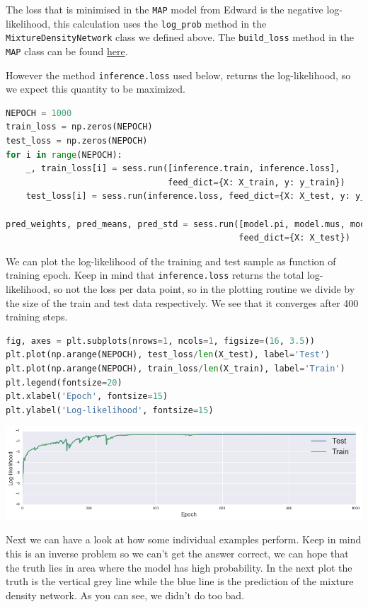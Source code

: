 The loss that is minimised in the \texttt{MAP} model from Edward is the negative log-likelihood, this calculation uses the  \texttt{log_prob} method in the \texttt{MixtureDensityNetwork} class we defined above.
The \texttt{build_loss} method in the \texttt{MAP} class can be found \href{https://github.com/blei-lab/edward/blob/master/edward/inferences.py#L396}{here}.

However the method \texttt{inference.loss} used below, returns the log-likelihood, so we expect this quantity to be maximized.

\begin{lstlisting}[language=Python]
NEPOCH = 1000
train_loss = np.zeros(NEPOCH)
test_loss = np.zeros(NEPOCH)
for i in range(NEPOCH):
    _, train_loss[i] = sess.run([inference.train, inference.loss],
                                feed_dict={X: X_train, y: y_train})
    test_loss[i] = sess.run(inference.loss, feed_dict={X: X_test, y: y_test})

pred_weights, pred_means, pred_std = sess.run([model.pi, model.mus, model.sigmas],
                                              feed_dict={X: X_test})
\end{lstlisting}

We can plot the log-likelihood of the training and test sample as function of training epoch.
Keep in mind that \texttt{inference.loss} returns the total log-likelihood, so not the loss per data point, so in the plotting routine we divide by the size of the train and test data respectively.
We see that it converges after 400 training steps.

\begin{lstlisting}[language=Python]
fig, axes = plt.subplots(nrows=1, ncols=1, figsize=(16, 3.5))
plt.plot(np.arange(NEPOCH), test_loss/len(X_test), label='Test')
plt.plot(np.arange(NEPOCH), train_loss/len(X_train), label='Train')
plt.legend(fontsize=20)
plt.xlabel('Epoch', fontsize=15)
plt.ylabel('Log-likelihood', fontsize=15)
\end{lstlisting}

\includegraphics[width=700px]{images/mdn-fig1.png}

Next we can have a look at how some individual examples perform. Keep in mind this is an inverse problem
so we can't get the answer correct, we can hope that the truth lies in area where the model has high probability.
In the next plot the truth is the vertical grey line while the blue line is the prediction of the mixture density network. As you can see, we didn't do too bad.


